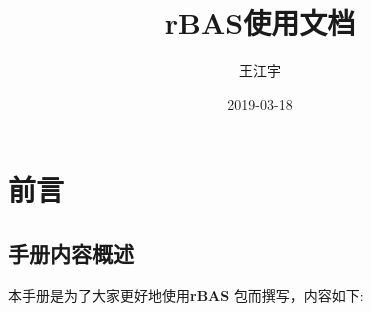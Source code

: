 \documentclass[]{ctexbook}
\title{rBAS使用文档}
\author{王江宇}
\date{2019-03-18}
\begin{document}
\maketitle

{
\setcounter{tocdepth}{2}
\tableofcontents
}
\listoftables
\listoffigures
\mainmatter

\chapter*{前言}


\section*{手册内容概述}


本手册是为了大家更好地使用\textbf{rBAS}
\citep{R-rBAS}包而撰写，内容如下:
\end{document}
